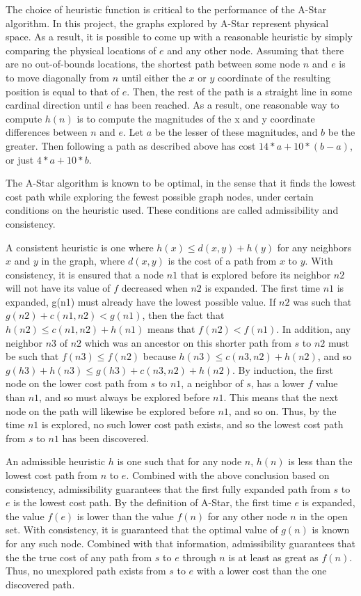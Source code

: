 The choice of heuristic function is critical to the performance of the A-Star algorithm. In this project, the graphs explored by A-Star represent physical space. As a result, it is possible to come up with a reasonable heuristic by simply comparing the physical locations of $e$ and any other node. Assuming that there are no out-of-bounds locations, the shortest path between some node $n$ and $e$ is to move diagonally from $n$ until either the $x$ or $y$ coordinate of the resulting position is equal to that of $e$. Then, the rest of the path is a straight line in some cardinal direction until $e$ has been reached. As a result, one reasonable way to compute $h(n)$ is to compute the magnitudes of the x and y coordinate differences between $n$ and $e$. Let $a$ be the lesser of these magnitudes, and $b$ be the greater. Then following a path as described above has cost $14 * a + 10 * (b - a)$, or just $4 * a  + 10 * b$. 

The A-Star algorithm is known to be optimal, in the sense that it finds the lowest cost path while exploring the fewest possible graph nodes, under certain conditions on the heuristic used. These conditions are called admissibility and consistency.

A consistent heuristic is one where $h(x) \leq d(x,y) + h(y)$ for any neighbors $x$ and $y$ in the graph, where $d(x, y)$ is the cost of a path from $x$ to $y$. With consistency, it is ensured that a node $n1$ that is explored before its neighbor $n2$ will not have its value of $f$ decreased when $n2$ is expanded. The first time $n1$ is expanded, g(n1) must already have the lowest possible value. If $n2$ was such that $g(n2) + c(n1, n2) < g(n1)$, then the fact that $h(n2) \leq c(n1, n2) + h(n1)$ means that $f(n2) < f(n1)$. In addition, any neighbor $n3$ of $n2$ which was an ancestor on this shorter path from $s$ to $n2$ must be such that $f(n3) \leq f(n2)$ because $h(n3) \leq c(n3, n2) + h(n2)$, and so $g (h3) + h(n3) \leq g (h3) + c(n3, n2) + h(n2)$. By induction, the first node on the lower cost path from $s$ to $n1$, a neighbor of $s$, has a lower $f$ value than $n1$, and so must always be explored before $n1$. This means that the next node on the path will likewise be explored before $n1$, and so on. Thus, by the time $n1$ is explored, no such lower cost path exists, and so the lowest cost path from $s$ to $n1$ has been discovered. 

An admissible heuristic $h$ is one such that for any node $n$, $h(n)$ is less than the lowest cost path from $n$ to $e$. Combined with the above conclusion based on consistency, admissibility guarantees that the first fully expanded path from $s$ to $e$ is the lowest cost path. By the definition of A-Star, the first time $e$ is expanded, the value $f(e)$ is lower than the value $f(n)$ for any other node $n$ in the open set. With consistency, it is guaranteed that the optimal value of $g(n)$ is known for any such node. Combined with that information, admissibility guarantees that the the true cost of any path from $s$ to $e$ through $n$ is at least as great as $f(n)$. Thus, no unexplored path exists from $s$ to $e$ with a lower cost than the one discovered path.

